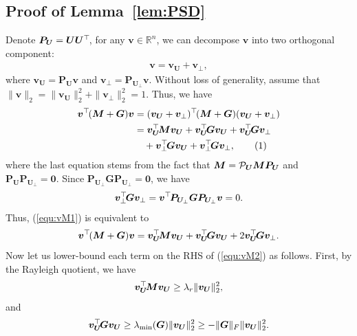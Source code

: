 \documentclass{article}
\def\P{{\cal P}}
\def\R{{\mathbb R}}
\newcommand{\norm}[1]{\|#1\|} %
\newcommand\numberthis{\addtocounter{equation}{1}\tag{\theequation}}
\newcommand{\topnew}{\top \hspace{-0.05cm}}
\begin{document}
\subsection{Proof of Lemma~\ref{lem:PSD}}
Denote $\bm P_{\bm U} = \bm U \bm U^\topnew$, for any $\bm v \in \R^n$, we can decompose $\bm v$ into two orthogonal component:
\begin{align*}
    \bm v = \bm v_{\bm U} + \bm v_{\perp},
\end{align*}
where $\bm v_{\bm U} = \bm P_{\bm U} \bm v$ and $\bm v_{\perp} = \bm P_{\bm U_\perp} \bm v$. Without loss of generality, assume that $\norm{\bm v}_2 = \norm{\bm v_{\bm U}}_2^2 + \norm{\bm v_{\perp}}_2^2 = 1$. Thus, we have
\begin{align*}
    \bm v^\topnew (\bm M + \bm G) \bm v &= (\bm v_{\bm U} + \bm v_{\perp})^\topnew (\bm M + \bm G) (\bm v_{\bm U} + \bm v_{\perp}) \\
    &= \bm v_{\bm U}^\topnew \bm M \bm v_{\bm U} + \bm v_{\bm U}^\topnew \bm G \bm v_{\bm U} + \bm v_{\bm U}^\topnew \bm G \bm v_{\perp} \\
    &\quad + \bm v_{\perp}^\topnew \bm G \bm v_{\bm U} + \bm v_{\perp}^\topnew \bm G \bm v_{\perp} , \numberthis \label{equ:vM1}
\end{align*}
where the last equation stems from the fact that $\bm M = \P_{\bm U} \bm M \bm P_{\bm U}$ and $\bm P_{\bm U} \bm P_{\bm U_\perp} = \bm 0$. Since $\bm P_{\bm U_\perp} \bm G \bm P_{\bm U_\perp} = \bm 0$, we have
\begin{align*}
    \bm v_{\perp}^\topnew \bm G \bm v_{\perp} = \bm v^\topnew \bm P_{\bm U_\perp} \bm G \bm P_{\bm U_\perp} \bm v = 0 .
\end{align*}
Thus, (\ref{equ:vM1}) is equivalent to
\begin{align} \label{equ:vM2}
    \bm v^\topnew (\bm M + \bm G) \bm v = \bm v_{\bm U}^\topnew \bm M \bm v_{\bm U} + \bm v_{\bm U}^\topnew \bm G \bm v_{\bm U} + 2 \bm v_{\bm U}^\topnew \bm G \bm v_{\perp} .
\end{align}
Now let us lower-bound each term on the RHS of (\ref{equ:vM2}) as follows. First, by the Rayleigh quotient, we have
\begin{align} \label{equ:vM21}
    \bm v_{\bm U}^\topnew \bm M \bm v_{\bm U} \geq \lambda_r \norm{\bm v_{\bm U}}_2^2 ,
\end{align}
and
\begin{align} \label{equ:vM22}
    \bm v_{\bm U}^\topnew \bm G \bm v_{\bm U} \geq \lambda_{\min}(\bm G) \norm{\bm v_{\bm U}}_2^2 \geq - \norm{\bm G}_F \norm{\bm v_{\bm U}}_2^2 .
\end{align}
\end{document}

